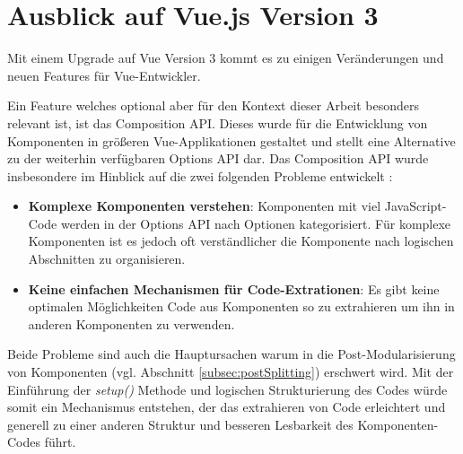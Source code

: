 \chapter{Ausblick auf Vue.js Version 3}
\label{cha:vue3}

Mit einem Upgrade auf Vue Version 3 kommt es zu einigen Veränderungen und neuen Features für Vue-Entwickler. 

Ein Feature welches optional aber für den Kontext dieser Arbeit besonders relevant ist, ist das Composition API. Dieses wurde für die Entwicklung von Komponenten in größeren Vue-Applikationen gestaltet und stellt eine Alternative zu der weiterhin verfügbaren Options API dar.
Das Composition API wurde insbesondere im Hinblick auf die zwei folgenden Probleme entwickelt \citep{Vue3DocsLogicReuse}: 

\begin{itemize}
  \item \textbf{Komplexe Komponenten verstehen}: Komponenten mit viel JavaScript-Code werden in der Options API nach Optionen kategorisiert. Für komplexe Komponenten ist es jedoch oft verständlicher die Komponente nach logischen Abschnitten zu organisieren.
  \item \textbf{Keine einfachen Mechanismen für Code-Extrationen}: Es gibt keine optimalen Möglichkeiten Code aus Komponenten so zu extrahieren um ihn in anderen Komponenten zu verwenden.
\end{itemize}

Beide Probleme sind auch die Hauptursachen warum in die Post-Modularisierung von Komponenten (vgl. Abschnitt \ref{subsec:postSplitting}) erschwert wird. Mit der Einführung der \textit{setup()} Methode und logischen Strukturierung des Codes würde somit ein Mechanismus entstehen, der das extrahieren von Code erleichtert und generell zu einer anderen Struktur und besseren Lesbarkeit des Komponenten-Codes führt.
